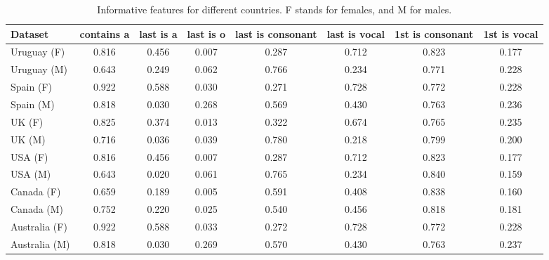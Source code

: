 \documentclass[a4paper]{article}
\begin{document}
\begin{table*}
\footnotesize
\center
\begin{tabular}[]{lccccccc}
  \hline
Dataset & contains a & last is a & last is o & last is consonant & last is vocal & 1st is consonant & 1st is vocal  \tabularnewline
  \hline
 Uruguay (F) &    0.816 &         0.456 &         0.007 &                 0.287 &             0.712 &                  0.823 &              0.177  \tabularnewline
 Uruguay (M) &    0.643 &         0.249 &         0.062 &                 0.766 &             0.234 &                  0.771 &              0.228  \tabularnewline
 Spain (F)   &    0.922 &         0.588 &          0.030 &                 0.271 &             0.728 &                  0.772 &              0.228  \tabularnewline
 Spain (M)   &    0.818 &          0.030 &         0.268 &                 0.569 &              0.430 &                  0.763 &              0.236  \tabularnewline
 UK (F)      &    0.825 &         0.374 &         0.013 &                 0.322 &             0.674 &                  0.765 &              0.235  \tabularnewline
 UK (M)      &    0.716 &         0.036 &         0.039 &                  0.780 &             0.218 &                  0.799 &                0.200  \tabularnewline
 USA (F)     &    0.816 &         0.456 &         0.007 &                 0.287 &             0.712 &                  0.823 &              0.177  \tabularnewline
 USA (M)     &    0.643 &          0.020 &         0.061 &                 0.765 &             0.234 &                   0.840 &              0.159  \tabularnewline
 Canada (F)  &    0.659 &         0.189 &         0.005 &                 0.591 &             0.408 &                  0.838 &              0.160  \tabularnewline
 Canada (M)  &    0.752 &          0.220 &         0.025 &                  0.540 &             0.456 &                  0.818 &              0.181  \tabularnewline
Australia (F)      &    0.922 &         0.588 &         0.033 &                 0.272 &             0.728 &                  0.772 &              0.228 \tabularnewline
 Australia (M)        &    0.818 &          0.030 &         0.269 &                  0.570 &              0.430 &                  0.763 &              0.237 \tabularnewline
 
\hline
\end{tabular}
\caption{Informative features for different countries. F stands for females, and M for males.}
\vspace{0.3cm}
\label{table:InfoFeatures}
\end{table*}
\end{document}
